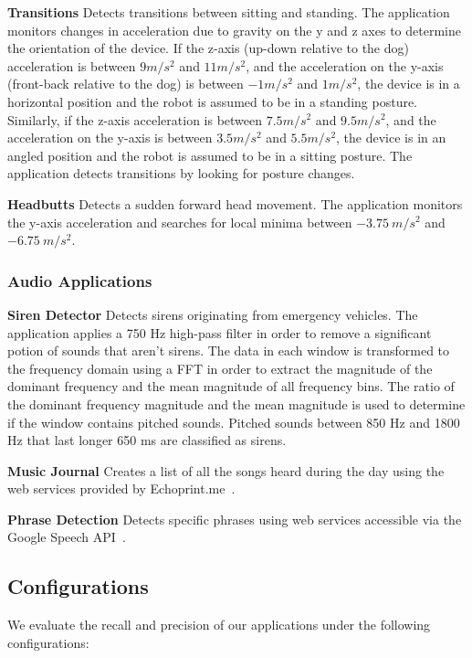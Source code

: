 {\bf Transitions} Detects transitions between sitting and
  standing.  The application monitors changes in acceleration due to
  gravity on the y and z axes to determine the orientation of the
  device. If the z-axis (up-down relative to the dog) acceleration is
  between $9 m/s^2$ and $11 m/s^2$, and the acceleration on the y-axis
  (front-back relative to the dog) is between $-1 m/s^2$ and $1
  m/s^2$, the device is in a horizontal position and the robot is
  assumed to be in a standing posture. Similarly, if the z-axis
  acceleration is between $7.5 m/s^2$ and $9.5 m/s^2$, and the
  acceleration on the y-axis is between $3.5 m/s^2$ and $5.5 m/s^2$,
  the device is in an angled position and the robot is assumed to be
  in a sitting posture. The application detects transitions by looking
  for posture changes.

{\bf Headbutts} Detects a sudden forward head movement.  The
  application monitors the y-axis acceleration and searches for local
  minima between $-3.75\:m/s^2$ and $-6.75\:m/s^2$.

\subsubsection{Audio Applications}

{\bf Siren Detector} Detects sirens originating from
emergency vehicles.  The application applies a 750 Hz high-pass filter 
in order to remove a significant
potion of sounds that aren't sirens.  The data in each window is transformed 
to the frequency domain using a FFT in order to extract the magnitude of the 
dominant frequency and the mean magnitude of all frequency bins.  The ratio
of the dominant frequency magnitude and the mean magnitude is used to determine
if the window contains pitched sounds.  Pitched sounds between 850 Hz and 1800 Hz
that last longer 650 ms are classified as sirens. 

{\bf Music Journal} Creates a list of all the songs heard during the
day using the web services provided by Echoprint.me~\cite{todo}.

{\bf Phrase Detection} Detects specific phrases using web services
accessible via the Google Speech API~\cite{todo}.


\subsection{Configurations}

We evaluate the recall and precision of our applications under the following configurations:

